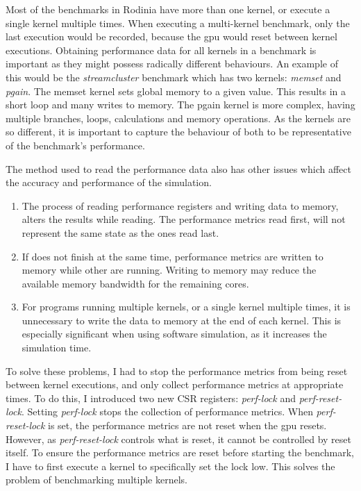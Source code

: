 Most of the benchmarks in Rodinia have more than one kernel, or execute a single kernel multiple times. When executing a multi-kernel benchmark, only the last execution would be recorded, because the \acrshort{gpu} would reset between kernel executions. Obtaining performance data for all kernels in a benchmark is important as they might possess radically different behaviours. An example of this would be the \textit{streamcluster} benchmark which has two kernels: \textit{memset} and \textit{pgain}. The memset kernel sets global memory to a given value. This results in a short loop and many writes to memory. The pgain kernel is more complex, having multiple branches, loops, calculations and memory operations. As the kernels are so different, it is important to capture the behaviour of both to be representative of the benchmark's performance.

The method used to read the performance data also has other issues which affect the accuracy and performance of the simulation.
\begin{enumerate}
    \item The process of reading performance registers and writing data to memory, alters the results while reading. The performance metrics read first, will not represent the same state as the ones read last.
    \item If  does not finish at the same time, performance metrics are written to memory while other  are running. Writing to memory may reduce the available memory bandwidth for the remaining cores.
    \item For programs running multiple kernels, or a single kernel multiple times, it is unnecessary to write the data to memory at the end of each kernel. This is especially significant when using software simulation, as it increases the simulation time.
\end{enumerate}

To solve these problems, I had to stop the performance metrics from being reset between kernel executions, and only collect performance metrics at appropriate times. To do this, I introduced two new CSR registers: \textit{perf-lock} and \textit{perf-reset-lock}. Setting \textit{perf-lock} stops the collection of performance metrics. When \textit{perf-reset-lock} is set, the performance metrics are not reset when the \acrshort{gpu} resets. However, as \textit{perf-reset-lock} controls what is reset, it cannot be controlled by reset itself. To ensure the performance metrics are reset before starting the benchmark, I have to first execute a kernel to specifically set the lock low. This solves the problem of benchmarking multiple kernels. 

